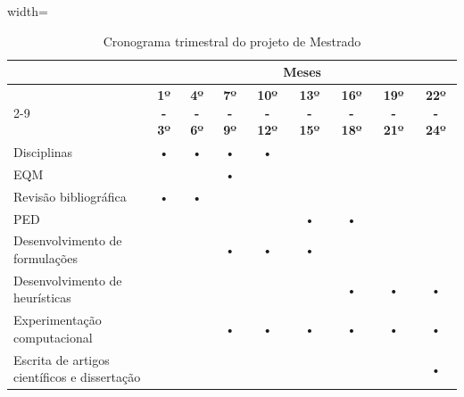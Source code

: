 \begin{table}[H]
\caption{Cronograma trimestral do projeto de Mestrado}
\label{cronograma}
\centering
\begin{adjustbox}{width=\textwidth}
\begin{tabular}{l ccc cccc c}
\toprule
 & \multicolumn{8}{c}{\textbf{Meses}} \\
\cmidrule{2-9}
 & \textbf{1º - 3º} & \textbf{4º - 6º} & \textbf{7º - 9º} & \textbf{10º - 12º} & \textbf{13º - 15º} & \textbf{16º - 18º} & \textbf{19º - 21º} & \textbf{22º - 24º} \\
\midrule
Disciplinas                   & • & • & • & • &   &   &   &   \\
EQM                           &   &   & • &   &   &   &   &   \\
Revisão bibliográfica        & • & • &   &   &   &   &   &   \\
PED                           &   &   &  &  & • & • &   &   \\
Desenvolvimento de formulações     &   &   & • & • & • &   &   &   \\
Desenvolvimento de heurísticas&   &   &   &   &  & • & •  &  • \\
Experimentação computacional  &   &   & • & • & • & • & • &  • \\
Escrita de artigos científicos e dissertação        &   &   &   &   &   &   &   & • \\
\bottomrule
\end{tabular}
\end{adjustbox}
\end{table}
